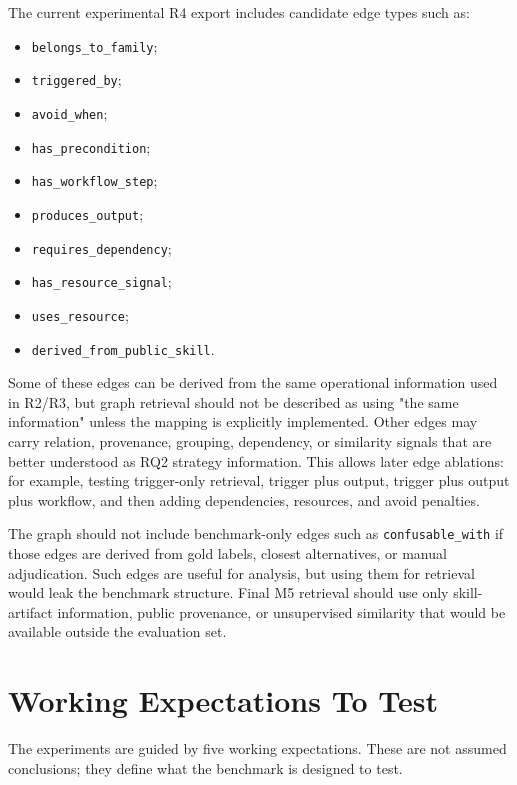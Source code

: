 The current experimental R4 export includes candidate edge types such as:

\begin{itemize}
  \item \texttt{belongs\_to\_family};
  \item \texttt{triggered\_by};
  \item \texttt{avoid\_when};
  \item \texttt{has\_precondition};
  \item \texttt{has\_workflow\_step};
  \item \texttt{produces\_output};
  \item \texttt{requires\_dependency};
  \item \texttt{has\_resource\_signal};
  \item \texttt{uses\_resource};
  \item \texttt{derived\_from\_public\_skill}.
\end{itemize}

Some of these edges can be derived from the same operational information used in R2/R3, but graph retrieval should not be described as using "the same information" unless the mapping is explicitly implemented. Other edges may carry relation, provenance, grouping, dependency, or similarity signals that are better understood as RQ2 strategy information. This allows later edge ablations: for example, testing trigger-only retrieval, trigger plus output, trigger plus output plus workflow, and then adding dependencies, resources, and avoid penalties.

The graph should not include benchmark-only edges such as \texttt{confusable\_with} if those edges are derived from gold labels, closest alternatives, or manual adjudication. Such edges are useful for analysis, but using them for retrieval would leak the benchmark structure. Final M5 retrieval should use only skill-artifact information, public provenance, or unsupervised similarity that would be available outside the evaluation set.

\section{Working Expectations To Test}

The experiments are guided by five working expectations. These are not assumed conclusions; they define what the benchmark is designed to test.

